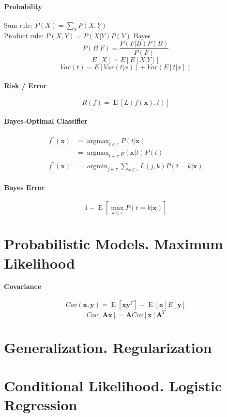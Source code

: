 \documentclass[7pt]{scrartcl}
\DeclareMathOperator*{\argmax}{argmax}
\DeclareMathOperator*{\argmin}{argmin}
\DeclareMathOperator{\E}{E}
\begin{document}
\begin{multicols}{4}
\paragraph{Probability}
\[\]
Sum rule: $P(X) = \sum_Y P(X,Y)$\\
Product rule: $P(X,Y) = P(X|Y)P(Y)$
Bayes  \[P(B|F) = \frac{P(F|B)P(B)}{P(F)}\]
\[E[X] = E[E[X|Y]]\]
\[Var(t) = E[Var(t|x)] + Var(E[t|x]) \]
\paragraph{Risk / Error}
\[ R(f) = \E \left [ L(f(\mathbf x), t) \right ] \]

\paragraph{Bayes-Optimal Classifier}
\begin{align*}
f^*(\mathbf x) &= \argmax_{t \in \tau} P(t|\mathbf x) \\ 
&= \argmax_{t \in \tau} p(\mathbf x|t) P(t) \\
f^*(\mathbf x) &= \argmin_{j \in \tau} \sum_{k \in \tau} L(j,k) P(t = k | \mathbf x) \end{align*}

\paragraph{Bayes Error}
\begin{equation*} 1 - \E \left [ \max_{k\in\tau} P(t = k | \mathbf x) \right ] \end{equation*}

\section{Probabilistic Models. Maximum Likelihood}
\paragraph{Covariance}

$$Cov(\mathbf x, \mathbf y) = \E[\mathbf x \mathbf y ^ T] - \E[\mathbf x]E[\mathbf y]$$
$$Cov[\mathbf A \mathbf x] = \mathbf A Cov[\mathbf x] \mathbf A^T$$


\section{Generalization. Regularization}
\section{Conditional Likelihood. Logistic Regression}

\end{multicols}
\end{document}
